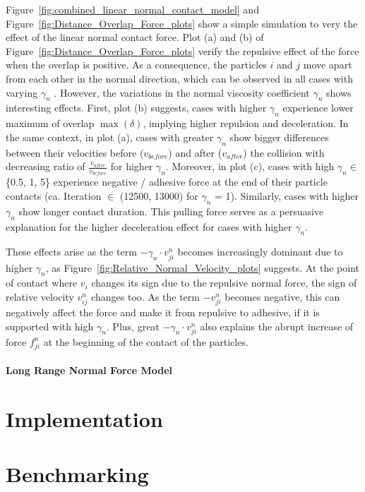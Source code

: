 \documentclass[11pt,
               a4paper,
               bibtotoc,
               idxtotoc,
               headsepline,
               footsepline,
               footexclude,
               BCOR12mm,
               DIV13,
               openany,   %
               ]
               {scrbook}
\begin{document}
Figure~\ref{fig:combined_linear_normal_contact_model} and Figure~\ref{fig:Distance_Overlap_Force_plots} show a simple simulation to very the effect of the linear normal contact force.  Plot (a) and (b) of Figure~\ref{fig:Distance_Overlap_Force_plots} verify the repulsive effect of the force when the overlap is positive. As a consequence, the particles $i$ and $j$ move apart from each other in the normal direction, which can be observed in all cases with varying $\gamma_n$ .  
However, the variations in the normal viscosity coefficient $\gamma_n$ shows interesting effects. First, plot (b) suggests, cases with higher $\gamma_n$ experience lower maximum of overlap $\max(\delta)$, implying higher repulsion and deceleration. In the same context, in plot (a), cases with greater $\gamma_n$ show bigger differences between their velocities before ($v_{before}$) and after ($v_{after}$) the collision with decreasing ratio of $\frac{v_{after}}{v_{before}}$ for higher $\gamma_n$. Moreover, in plot (c), cases with high $\gamma_n \in$ \{0.5, 1, 5\} experience negative  / adhesive force at the end of their particle contacts (ca. Iteration $\in$ (12500, 13000) for $\gamma_n$ = 1). Similarly, cases with higher $\gamma_n$ show longer contact duration. This pulling force serves as a persuasive explanation for the higher deceleration effect for cases with higher $\gamma_n$.

These effects arise as the term $-\gamma_n \cdot v^n_{ji}$ becomes increasingly dominant due to higher $\gamma_n$, as Figure~\ref{fig:Relative_Normal_Velocity_plots} suggests. At the point of contact where $v_i$ changes its sign due to the repulsive normal force, the sign of relative velocity $v^n_{ij}$ changes too. As the term $-v^n_{ji}$ becomes negative, this can negatively affect the force and make it from repulsive to adhesive, if it is supported with high $\gamma_n$. Plus, great $-\gamma_n \cdot v^n_{ji}$ also explains the abrupt increase of force $f^n_{ji}$ at the beginning of the contact of the particles.

\subsection{Long Range Normal Force Model}




\part{Implementation}

\part{Benchmarking}
\end{document}
